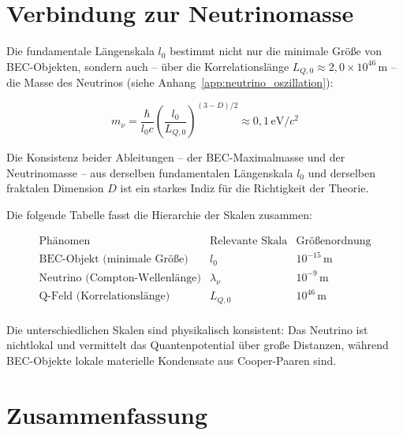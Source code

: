 \section{Verbindung zur Neutrinomasse}
\label{app:bec_neutrino_verbindung}

Die fundamentale Längenskala \( l_0 \) bestimmt nicht nur die minimale Größe von BEC-Objekten, sondern auch – über die Korrelationslänge \( L_{Q,0} \approx 2{,}0 \times 10^{46} \, \text{m} \) – die Masse des Neutrinos (siehe Anhang~\ref{app:neutrino_oszillation}):

\[
m_\nu = \frac{\hbar}{l_0 c} \left( \frac{l_0}{L_{Q,0}} \right)^{(3-D)/2} \approx 0,1 \, \text{eV}/c^2
\]

Die Konsistenz beider Ableitungen – der BEC-Maximalmasse und der Neutrinomasse – aus derselben fundamentalen Längenskala \( l_0 \) und derselben fraktalen Dimension \( D \) ist ein starkes Indiz für die Richtigkeit der Theorie.

Die folgende Tabelle fasst die Hierarchie der Skalen zusammen:

\[
\begin{array}{l|c|c}
\text{Phänomen} & \text{Relevante Skala} & \text{Größenordnung} \\
\hline
\text{BEC-Objekt (minimale Größe)} & l_0 & 10^{-15} \, \text{m} \\
\text{Neutrino (Compton-Wellenlänge)} & \lambda_\nu & 10^{-9} \, \text{m} \\
\text{Q-Feld (Korrelationslänge)} & L_{Q,0} & 10^{46} \, \text{m} \\
\end{array}
\]

Die unterschiedlichen Skalen sind physikalisch konsistent: Das Neutrino ist nichtlokal und vermittelt das Quantenpotential über große Distanzen, während BEC-Objekte lokale materielle Kondensate aus Cooper-Paaren sind.

\section{Zusammenfassung}
\label{app:bec_zusammenfassung}

